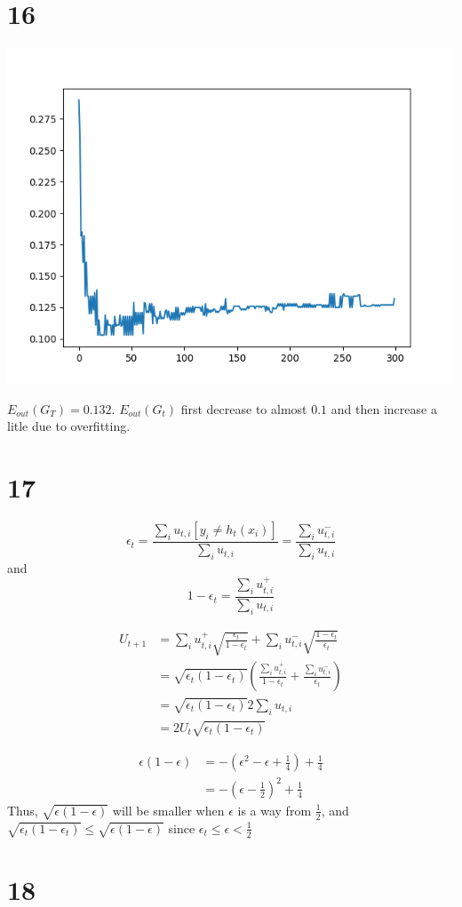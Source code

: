 \documentclass[12pt]{article}
\begin{document}
\section*{16}
\begin{center}
    \includegraphics[scale=0.5]{p16.png}
\end{center}
$E_{out}(G_T) = 0.132$. $E_{out}(G_t)$ first decrease to almost $0.1$ 
and then increase a litle due to overfitting.

\section*{17}
\[
    \epsilon_t = \frac{\sum_i u_{t, i} [y_i \neq h_t(x_i)]}{\sum_i u_{t, i}}
    =  \frac{\sum_i u_{t, i}^-}{\sum_i u_{t, i}}
\]
and 
\[
    1 - \epsilon_t = \frac{\sum_i u_{t, i}^+}{\sum_i u_{t, i}}
\]

\begin{equation*}
    \begin{split}
        U_{t+1} &= \sum_i u_{t, i}^+ \sqrt{\frac{\epsilon_t}{1-\epsilon_t}} + \sum_i u_{t, i}^- \sqrt{\frac{1-\epsilon_t}{\epsilon_t}} \\
        &= \sqrt{\epsilon_t(1-\epsilon_t)} (\frac{\sum_i u_{t,i}^+}{1-\epsilon_t} + \frac{\sum_i u_{t,i}^-}{\epsilon_t}) \\
        &= \sqrt{\epsilon_t(1-\epsilon_t)} 2 \sum_i u_{t, i} \\
        &= 2 U_t \sqrt{\epsilon_t(1-\epsilon_t)}
    \end{split}
\end{equation*}

\begin{equation*}
    \begin{split}
        \epsilon (1 - \epsilon) &= - (\epsilon^2 - \epsilon + \frac{1}{4}) + \frac{1}{4} \\
        &= -(\epsilon - \frac{1}{2})^2 + \frac{1}{4}
    \end{split}
\end{equation*}
Thus, $\sqrt{\epsilon(1-\epsilon)}$ will be smaller when $\epsilon$ is a way from $\frac{1}{2}$,
and $\sqrt{\epsilon_t(1-\epsilon_t)} \leq \sqrt{\epsilon(1-\epsilon)}$ since
$\epsilon_t \leq \epsilon < \frac{1}{2}$

\section*{18}
\end{document}
